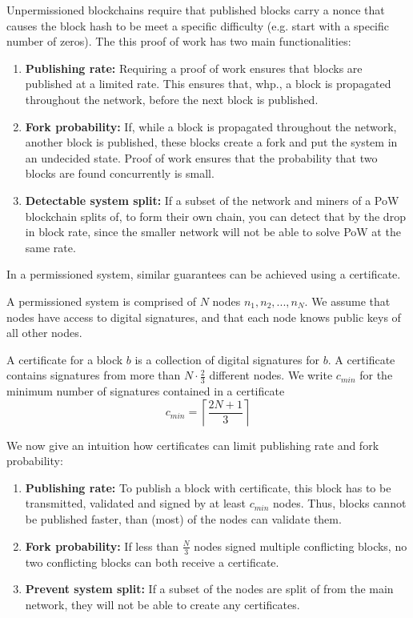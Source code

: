 
\noindent
Unpermissioned blockchains require that published blocks carry a nonce that causes the block hash to be meet a specific difficulty (e.g. start with a specific number of zeros). The this proof of work has two main functionalities:

\begin{enumerate}
	\item \textbf{Publishing rate:} Requiring a proof of work ensures that blocks are published at a limited rate. This ensures that, whp., a block is propagated throughout the network, before the next block is published.
	\item \textbf{Fork probability:} If, while a block is propagated throughout the network, another block is published, these blocks create a fork and put the system in an undecided state. Proof of work ensures that the probability that two blocks are found concurrently is small. 
	\item \textbf{Detectable system split:} If a subset of the network and miners of a PoW blockchain splits of, to form their own chain, you can detect that by the drop in block rate, since the smaller network will not be able to solve PoW at the same rate.
\end{enumerate}

In a permissioned system, similar guarantees can be achieved using a certificate.

\begin{definition}
	A permissioned system is comprised of $N$ nodes $n_1, n_2, ..., n_N$.
	We assume that nodes have access to digital signatures, and that each node knows public keys of all other nodes.	
\end{definition}

\begin{definition}
A certificate for a block $b$ is a collection of digital signatures for $b$. 
A certificate contains signatures from more than $N\cdot\frac{2}{3}$ different nodes. We write $c_{min}$ for the minimum number of signatures contained in a certificate $$c_{min} = \left\lceil\frac{2N+1}{3}\right\rceil$$
\end{definition}


\begin{idea} We now give an intuition how certificates can limit publishing rate and fork probability:
	\begin{enumerate}
		\item \textbf{Publishing rate:} To publish a block with certificate, this block has to be transmitted, validated and signed by at least $c_{min}$ nodes. Thus, blocks cannot be published faster, than (most) of the nodes can validate them.
		\item \textbf{Fork probability:} If less than $\frac{N}{3}$ nodes signed multiple conflicting blocks, no two conflicting blocks can both receive a certificate.
		\item \textbf{Prevent system split:} If a subset of the nodes are split of from the main network, they will not be able to create any certificates.
 	\end{enumerate}
\end{idea}
